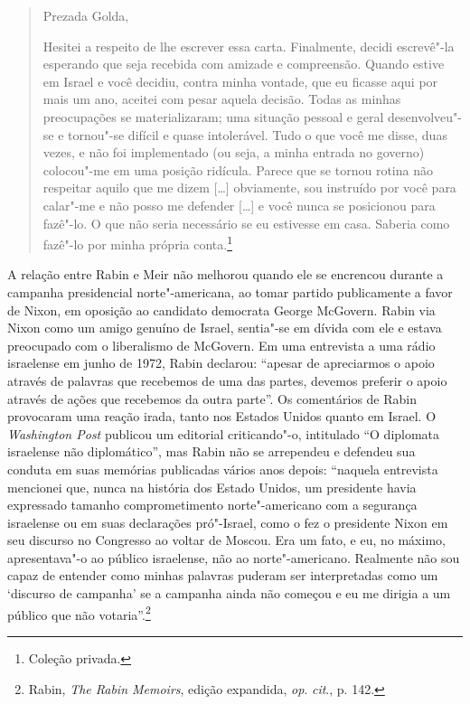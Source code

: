 \begin{quote}
Prezada Golda,

Hesitei a respeito de lhe escrever essa carta. Finalmente, decidi
escrevê"-la esperando que seja recebida com amizade e compreensão. Quando
estive em Israel e você decidiu, contra minha vontade, que eu ficasse
aqui por mais um ano, aceitei com pesar aquela decisão. Todas as minhas
preocupações se materializaram; uma situação pessoal e geral
desenvolveu"-se e tornou"-se difícil e quase intolerável. Tudo o que você
me disse, duas vezes, e não foi implementado (ou seja, a minha entrada
no governo) colocou"-me em uma posição ridícula. Parece que se tornou
rotina não respeitar aquilo que me dizem {[}\ldots{}{]} obviamente, sou instruído por
você para calar"-me e não posso me defender {[}\ldots{}{]} e você nunca se posicionou
para fazê"-lo. O que não seria necessário se eu estivesse em casa. Saberia como
fazê"-lo por minha própria conta.\footnote{Coleção privada.}
\end{quote}

A relação entre Rabin e Meir não melhorou quando ele se encrencou
durante a campanha presidencial norte"-americana, ao tomar partido
publicamente a favor de Nixon, em oposição ao candidato democrata George
McGovern. Rabin via Nixon como um amigo genuíno de Israel, sentia"-se em
dívida com ele e estava preocupado com o liberalismo de McGovern. Em uma
entrevista a uma rádio israelense em junho de 1972, Rabin declarou:
``apesar de apreciarmos o apoio através de palavras que recebemos de uma
das partes, devemos preferir o apoio através de ações que recebemos da
outra parte''. Os comentários de Rabin provocaram uma reação irada,
tanto nos Estados Unidos quanto em Israel. O \emph{Washington Post}
publicou um editorial criticando"-o, intitulado ``O diplomata israelense
não diplomático'', mas Rabin não se arrependeu e defendeu sua conduta em
suas memórias publicadas vários anos depois: ``naquela entrevista
mencionei que, nunca na história dos Estado Unidos, um presidente havia
expressado tamanho comprometimento norte"-americano com a segurança
israelense ou em suas declarações pró"-Israel, como o fez o presidente
Nixon em seu discurso no Congresso ao voltar de Moscou. Era um fato, e
eu, no máximo, apresentava"-o ao público israelense, não ao
norte"-americano. Realmente não sou capaz de entender como minhas
palavras puderam ser interpretadas como um `discurso de campanha' se a
campanha ainda não começou e eu me dirigia a um público que não
votaria''.\footnote{Rabin, \emph{The Rabin Memoirs}, edição expandida, \emph{op}. 
\emph{cit}., p. 142.}

